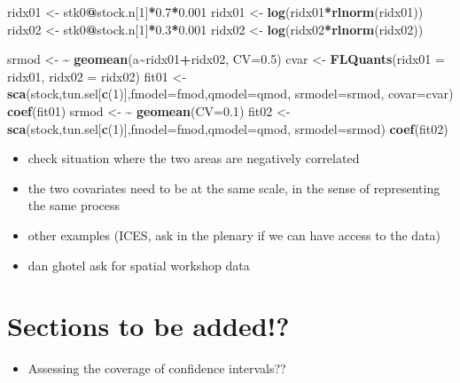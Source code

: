 \documentclass[
]{book}
\newenvironment{Shaded}{\begin{snugshade}}{\end{snugshade}}
\newcommand{\AttributeTok}[1]{\textcolor[rgb]{0.13,0.29,0.53}{#1}}
\newcommand{\DecValTok}[1]{\textcolor[rgb]{0.00,0.00,0.81}{#1}}
\newcommand{\ErrorTok}[1]{\textcolor[rgb]{0.64,0.00,0.00}{\textbf{#1}}}
\newcommand{\FloatTok}[1]{\textcolor[rgb]{0.00,0.00,0.81}{#1}}
\newcommand{\FunctionTok}[1]{\textcolor[rgb]{0.13,0.29,0.53}{\textbf{#1}}}
\newcommand{\NormalTok}[1]{#1}
\newcommand{\OtherTok}[1]{\textcolor[rgb]{0.56,0.35,0.01}{#1}}
\newcommand{\SpecialCharTok}[1]{\textcolor[rgb]{0.81,0.36,0.00}{\textbf{#1}}}
\providecommand{\tightlist}{%
  \setlength{\itemsep}{0pt}\setlength{\parskip}{0pt}}
\begin{document}
\begin{Shaded}
\begin{Highlighting}[]
\NormalTok{ridx01 }\OtherTok{\textless{}{-}}\NormalTok{ stk0}\SpecialCharTok{@}\NormalTok{stock.n[}\DecValTok{1}\NormalTok{]}\SpecialCharTok{*}\FloatTok{0.7}\SpecialCharTok{*}\FloatTok{0.001}
\NormalTok{ridx01 }\OtherTok{\textless{}{-}} \FunctionTok{log}\NormalTok{(ridx01}\SpecialCharTok{*}\FunctionTok{rlnorm}\NormalTok{(ridx01))}
\NormalTok{ridx02 }\OtherTok{\textless{}{-}}\NormalTok{ stk0}\SpecialCharTok{@}\NormalTok{stock.n[}\DecValTok{1}\NormalTok{]}\SpecialCharTok{*}\FloatTok{0.3}\SpecialCharTok{*}\FloatTok{0.001}
\NormalTok{ridx02 }\OtherTok{\textless{}{-}} \FunctionTok{log}\NormalTok{(ridx02}\SpecialCharTok{*}\FunctionTok{rlnorm}\NormalTok{(ridx02))}

\NormalTok{srmod }\OtherTok{\textless{}{-}} \ErrorTok{\textasciitilde{}} \FunctionTok{geomean}\NormalTok{(a}\SpecialCharTok{\textasciitilde{}}\NormalTok{ridx01}\SpecialCharTok{+}\NormalTok{ridx02, }\AttributeTok{CV=}\FloatTok{0.5}\NormalTok{)}
\NormalTok{cvar }\OtherTok{\textless{}{-}} \FunctionTok{FLQuants}\NormalTok{(}\AttributeTok{ridx01 =}\NormalTok{ ridx01, }\AttributeTok{ridx02 =}\NormalTok{ ridx02)}
\NormalTok{fit01 }\OtherTok{\textless{}{-}} \FunctionTok{sca}\NormalTok{(stock,tun.sel[}\FunctionTok{c}\NormalTok{(}\DecValTok{1}\NormalTok{)],}\AttributeTok{fmodel=}\NormalTok{fmod,}\AttributeTok{qmodel=}\NormalTok{qmod, }\AttributeTok{srmodel=}\NormalTok{srmod, }\AttributeTok{covar=}\NormalTok{cvar)}
\FunctionTok{coef}\NormalTok{(fit01)}
\NormalTok{srmod }\OtherTok{\textless{}{-}} \ErrorTok{\textasciitilde{}} \FunctionTok{geomean}\NormalTok{(}\AttributeTok{CV=}\FloatTok{0.1}\NormalTok{)}
\NormalTok{fit02 }\OtherTok{\textless{}{-}} \FunctionTok{sca}\NormalTok{(stock,tun.sel[}\FunctionTok{c}\NormalTok{(}\DecValTok{1}\NormalTok{)],}\AttributeTok{fmodel=}\NormalTok{fmod,}\AttributeTok{qmodel=}\NormalTok{qmod, }\AttributeTok{srmodel=}\NormalTok{srmod)}
\FunctionTok{coef}\NormalTok{(fit02)}
\end{Highlighting}
\end{Shaded}

\begin{itemize}
\tightlist
\item
  check situation where the two areas are negatively correlated
\item
  the two covariates need to be at the same scale, in the sense of representing the same process
\item
  other examples (ICES, ask in the plenary if we can have access to the data)
\item
  dan ghotel ask for spatial workshop data
\end{itemize}

\hypertarget{sections-to-be-added}{%
\chapter{Sections to be added!?}\label{sections-to-be-added}}

\begin{itemize}
\tightlist
\item
  Assessing the coverage of confidence intervals??
\end{itemize}

  
\end{document}
